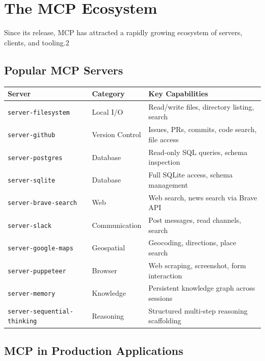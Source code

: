 \section{The MCP Ecosystem}
\label{sec:mcp:ecosystem}

Since its release, MCP has attracted a rapidly growing ecosystem of servers, clients, and tooling.2

\subsection{Popular MCP Servers}
\label{popular-mcp-servers}

\begin{keybox}
{\small
\begin{tabular}{@{}llp{7.5cm}@{}}
\toprule
\textbf{Server} & \textbf{Category} & \textbf{Key Capabilities} \\
\midrule
\texttt{server-filesystem} & Local I/O & Read/write files, directory listing, search \\
\texttt{server-github} & Version Control & Issues, PRs, commits, code search, file access \\
\texttt{server-postgres} & Database & Read-only SQL queries, schema inspection \\
\texttt{server-sqlite} & Database & Full SQLite access, schema management \\
\texttt{server-brave-search} & Web & Web search, news search via Brave API \\
\texttt{server-slack} & Communication & Post messages, read channels, search \\
\texttt{server-google-maps} & Geospatial & Geocoding, directions, place search \\
\texttt{server-puppeteer} & Browser & Web scraping, screenshot, form interaction \\
\texttt{server-memory} & Knowledge & Persistent knowledge graph across sessions \\
\texttt{server-sequential-thinking} & Reasoning & Structured multi-step reasoning scaffolding \\
\bottomrule
\end{tabular}
}
\end{keybox}

\subsection{MCP in Production Applications}
\label{mcp-in-production-applications}

